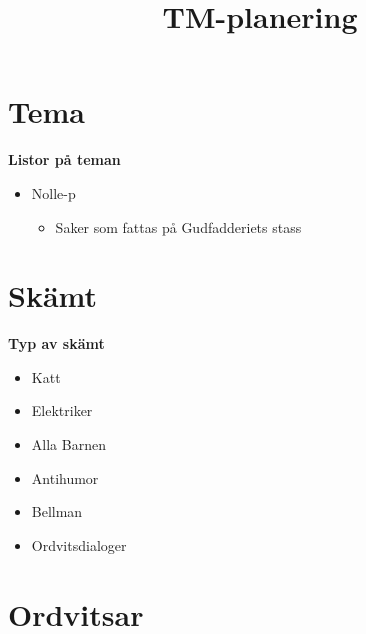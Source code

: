 \documentclass{article}
\title{TM-planering} \date{}
\begin{document}
\maketitle
\section{Tema}
\label{sec:tema}

\textbf{Listor på teman}
\begin{itemize}
\item Nolle-p
  \begin{itemize}
  \item Saker som fattas på Gudfadderiets stass
  \end{itemize}
\end{itemize}

\section{Skämt}
\label{sec:skamt}

\textbf{Typ av skämt}
\begin{itemize}
\item Katt
\item Elektriker
\item Alla Barnen
\item Antihumor
\item Bellman
\item Ordvitsdialoger
\end{itemize}

\clearpage
\section{Ordvitsar}
\label{sec:ordvitsar}
\end{document}
